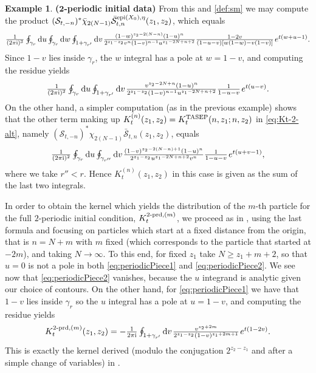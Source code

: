 \documentclass[letterpaper,reqno,11pt,oneside,final]{amsart}
\theoremstyle{definition}
\newtheorem{ex}[thm]{Example}
\newcommand{\I}{\uptext{i}}
\newcommand{\ts}{\hspace{0.1em}}
\newcommand{\uptext}[1]{\text{\upshape{#1}}}
\DeclareMathOperator{\epi}{\uptext{epi}}
\DeclareMathOperator{\oepi}{\epi}
\renewcommand{\d}{\mathrm{d}}
\newcommand{\TASEP}{\uptext{TASEP}}
\newcommand{\SM}{\mathcal{S}}
\newcommand{\SN}{\bar{\mathcal{S}}}
\renewcommand{\P}{\chi}
\numberwithin{equation}{section}
\begin{document}
\begin{ex}{\bf ($\bm{2}$-periodic initial data)}
From this and \eqref{def:sm} we may compute the product $(\SM_{t,-{n}})^*\bar\P_{2(N-1)}\SN_{t,n}^{\oepi(X_0),\eta}(z_1,z_2)$, which equals
\[\textstyle\frac1{(2\pi\I)^3}\oint_{\gamma_r}\d u\oint_{\gamma_r} \d w\oint_{1+\gamma_{r'}}\d v\ts \frac{(1-w)^{z_2-2(N-n)}(1-u)^n}{2^{z_1-z_2}v^n(1-v)^{n-1}u^{z_1-2N+n+2}}\frac{1-2v}{(1-u-v)[w(1-w)-v(1-v)]}\ts e^{t(w+u-1)}.\]
Since $1-v$ lies inside $\gamma_r$, the $w$ integral has a pole at $w=1-v$, and computing the residue yields
\begin{equation}\label{eq:periodicPiece1}
\textstyle\frac1{(2\pi\I)^2}\oint_{\gamma_r}\d u\oint_{1+\gamma_{r'}}\d v\ts \frac{v^{z_2-2N+n}(1-u)^n}{2^{z_1-z_2}(1-v)^{n-1}u^{z_1-2N+n+2}}\frac{1}{1-u-v}\ts e^{t(u-v)}.
\end{equation}
On the other hand, a simpler computation (as in the previous example) shows that the other term making up $K_t^{(n)}(z_1,z_2)=K^\TASEP_t(n,z_1;n,z_2)$ in \eqref{eq:Kt-2-alt}, namely $(\SM_{t,-{n}})^*\P_{2(N-1)}\SN_{t,n}(z_1,z_2)$, equals
\begin{equation}\label{eq:periodicPiece2}
\textstyle\frac1{(2\pi\I)^2}\oint_{\gamma_r}\d u\oint_{\gamma_{r''}} \d v\ts \frac{(1-v)^{z_2-2(N-n)+1}(1-u)^n}{2^{z_1-z_2}u^{z_1-2N+n+2}v^n}\frac{1}{1-u-v}\ts e^{t(u+v-1)},
\end{equation}
where we take $r''<r$.
Hence $K_t^{(n)}(z_1,z_2)$ in this case is given as the sum of the last two integrals.

\noindent In order to obtain the kernel which yields the distribution of the $m$-th particle for the full $2$-periodic initial condition, $K^{2\uptext{-prd},(m)}_t$, we proceed as in \cite{borFerPrahSasam}, using the last formula and focusing on particles which start at a fixed distance from the origin, that is $n=N+m$ with $m$ fixed (which corresponds to the particle that started at $-2m$), and taking $N\to\infty$.
To this end, for fixed $z_1$ take $N\geq z_1+m+2$, so that $u=0$ is not a pole in both \eqref{eq:periodicPiece1} and \eqref{eq:periodicPiece2}.
We see now that \eqref{eq:periodicPiece2} vanishes, because the $u$ integrand is analytic given our choice of contours.
On the other hand, for \eqref{eq:periodicPiece1} we have that $1-v$ lies inside $\gamma_r$ so the $u$ integral has a pole at $u=1-v$, and computing the residue yields
\begin{equation}
\textstyle K^{2\uptext{-prd},(m)}_t(z_1,z_2)=-\frac1{2\pi\I}\oint_{1+\gamma_{r'}}\d v\ts \frac{v^{z_2+2m}}{2^{z_1-z_2}(1-v)^{z_1+2m+1}}\ts e^{t(1-2v)}.\label{eq:Kn2per}
\end{equation}
This is exactly the kernel derived (modulo the conjugation $2^{z_2-z_1}$ and after a simple change of variables) in \cite[Thm. 2.2]{borFerPrahSasam}.
\end{ex}
\end{document}

